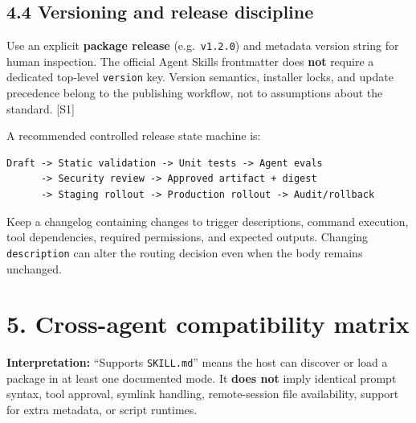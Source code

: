 \documentclass[
  10pt,
  letterpaper,
]{article}
\newcommand{\passthrough}[1]{#1}
\begin{document}
\subsection{4.4 Versioning and release
discipline}\label{versioning-and-release-discipline}

Use an explicit \textbf{package release}
(e.g.~\passthrough{\lstinline!v1.2.0!}) and metadata version string for
human inspection. The official Agent Skills frontmatter does
\textbf{not} require a dedicated top-level
\passthrough{\lstinline!version!} key. Version semantics, installer
locks, and update precedence belong to the publishing workflow, not to
assumptions about the standard. {[}S1{]}

A recommended controlled release state machine is:

\begin{lstlisting}
Draft -> Static validation -> Unit tests -> Agent evals
      -> Security review -> Approved artifact + digest
      -> Staging rollout -> Production rollout -> Audit/rollback
\end{lstlisting}

Keep a changelog containing changes to trigger descriptions, command
execution, tool dependencies, required permissions, and expected
outputs. Changing \passthrough{\lstinline!description!} can alter the
routing decision even when the body remains unchanged.

\section{5. Cross-agent compatibility
matrix}\label{cross-agent-compatibility-matrix}

\textbf{Interpretation:} ``Supports \passthrough{\lstinline!SKILL.md!}''
means the host can discover or load a package in at least one documented
mode. It \textbf{does not} imply identical prompt syntax, tool approval,
symlink handling, remote-session file availability, support for extra
metadata, or script runtimes.
\end{document}
